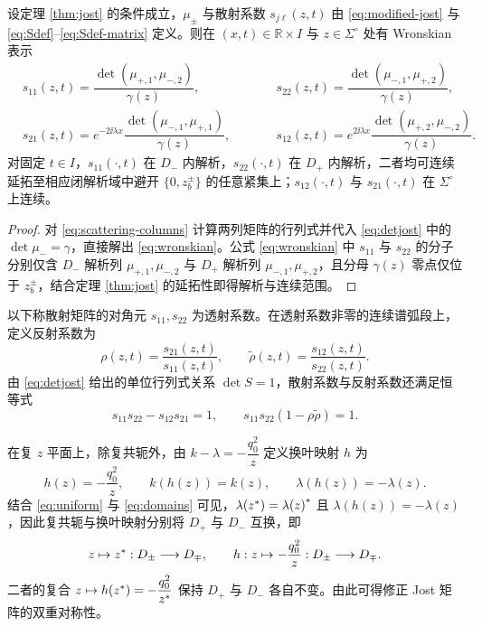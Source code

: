 \begin{proposition}\label{prop:scattering}
设定理 \ref{thm:jost} 的条件成立，$\mu_\pm$ 与散射系数 $s_{j\ell}(z,t)$ 由 \eqref{eq:modified-jost} 与 \eqref{eq:Sdef}--\eqref{eq:Sdef-matrix} 定义。则在 $(x,t)\in\mathbb R\times I$ 与 $z\in\Sigma^\circ$ 处有 Wronskian 表示
\begin{equation}\label{eq:wronskian}
\begin{aligned}
&s_{11}(z,t)=\dfrac{\det(\mu_{+,1},\mu_{-,2})}{\gamma(z)},\\
&s_{21}(z,t)=e^{-2\ii\lambda x}\dfrac{\det(\mu_{-,1},\mu_{+,1})}{\gamma(z)},
\end{aligned}
\qquad
\begin{aligned}
&s_{22}(z,t)=\dfrac{\det(\mu_{-,1},\mu_{+,2})}{\gamma(z)},\\
&s_{12}(z,t)=e^{2\ii\lambda x}\dfrac{\det(\mu_{+,2},\mu_{-,2})}{\gamma(z)}.
\end{aligned}
\end{equation}
对固定 $t\in I$，$s_{11}(\cdot,t)$ 在 $D_-$ 内解析，$s_{22}(\cdot,t)$ 在 $D_+$ 内解析，二者均可连续延拓至相应闭解析域中避开 $\{0,z_b^\pm\}$ 的任意紧集上；$s_{12}(\cdot,t)$ 与 $s_{21}(\cdot,t)$ 在 $\Sigma^\circ$ 上连续。
\end{proposition}
\begin{proof}
对 \eqref{eq:scattering-columns} 计算两列矩阵的行列式并代入 \eqref{eq:detjost} 中的 $\det\mu_-=\gamma$，直接解出 \eqref{eq:wronskian}。公式 \eqref{eq:wronskian} 中 $s_{11}$ 与 $s_{22}$ 的分子分别仅含 $D_-$ 解析列 $\mu_{+,1},\mu_{-,2}$ 与 $D_+$ 解析列 $\mu_{-,1},\mu_{+,2}$，且分母 $\gamma(z)$ 零点仅位于 $z_b^\pm$，结合定理 \ref{thm:jost} 的延拓性即得解析与连续范围。
\end{proof}

以下称散射矩阵的对角元 $s_{11},s_{22}$ 为透射系数。在透射系数非零的连续谱弧段上，定义反射系数为
\begin{equation}\label{eq:reflection}
\rho(z,t)=\dfrac{s_{21}(z,t)}{s_{11}(z,t)},\qquad
\widetilde\rho(z,t)=\dfrac{s_{12}(z,t)}{s_{22}(z,t)}.
\end{equation}
由 \eqref{eq:detjost} 给出的单位行列式关系 $\det S=1$，散射系数与反射系数还满足恒等式
\begin{equation}\label{eq:scattering-determinant}
s_{11}s_{22}-s_{12}s_{21}=1,\qquad
s_{11}s_{22}(1-\rho\widetilde\rho)=1.
\end{equation}

在复 $z$ 平面上，除复共轭外，由 $k-\lambda=-\dfrac{q_0^2}{z}$ 定义换叶映射 $h$ 为
\begin{equation}\label{eq:sheet}
h(z)=-\dfrac{q_0^2}{z},\qquad
k(h(z))=k(z),\qquad
\lambda(h(z))=-\lambda(z).
\end{equation}
结合 \eqref{eq:uniform} 与 \eqref{eq:domains} 可见，$\lambda({z}^{*})={\lambda(z)}^{*}$ 且 $\lambda(h(z))=-\lambda(z)$，因此复共轭与换叶映射分别将 $D_+$ 与 $D_-$ 互换，即
\begin{equation}\label{eq:symmetry-domains}
z\mapsto{z}^{*}:D_\pm\longrightarrow D_\mp,\qquad
h:z\mapsto-\dfrac{q_0^2}{z}:D_\pm\longrightarrow D_\mp.
\end{equation}
二者的复合 $z\mapsto h({z}^{*})=-\dfrac{q_0^2}{{z}^{*}}$ 保持 $D_+$ 与 $D_-$ 各自不变。由此可得修正 Jost 矩阵的双重对称性。

